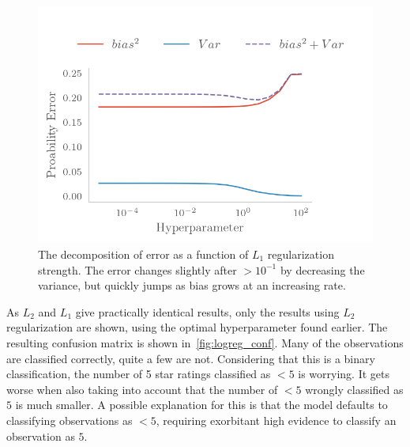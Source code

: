 \begin{figure}[H]
    \centering
    \includegraphics{Figures/logreg_biasvar_l1.png}
    \caption{The decomposition of error as a function of $L_1$ regularization
    strength. The error changes slightly after $>10^{-1}$ by decreasing the variance, but quickly jumps as bias grows at an increasing rate.}
    \label{fig:logregl1}
\end{figure}

As $L_2$ and $L_1$ give practically identical results, only the results using $L_2$
regularization are shown, using the optimal hyperparameter found earlier. The
resulting confusion matrix is shown in~\cref{fig:logreg_conf}. Many of the observations are classified correctly, quite a few are not. Considering that this is a binary classification, the number of 5 star ratings classified as $<5$ is worrying.
It gets worse when also taking into account that the number of $<5$ wrongly classified as $5$ is much smaller. A possible explanation for this is that the model defaults to classifying observations as $<5$, requiring exorbitant high evidence to classify an observation as $5$.

